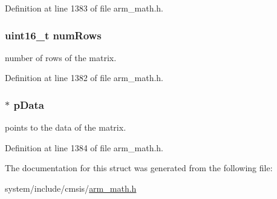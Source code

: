 Definition at line 1383 of file arm\+\_\+math.\+h.

\subsubsection[{\texorpdfstring{num\+Rows}{numRows}}]{\setlength{\rightskip}{0pt plus 5cm}uint16\+\_\+t num\+Rows}\hypertarget{structarm__matrix__instance__f64_a1bcf80ccdc2acc29198f1592ae300390}{}\label{structarm__matrix__instance__f64_a1bcf80ccdc2acc29198f1592ae300390}
number of rows of the matrix. 

Definition at line 1382 of file arm\+\_\+math.\+h.

\subsubsection[{\texorpdfstring{p\+Data}{pData}}]{$\ast$ p\+Data}\hypertarget{structarm__matrix__instance__f64_aa7a4c9839c31e933360ef3a3167b9877}{}\label{structarm__matrix__instance__f64_aa7a4c9839c31e933360ef3a3167b9877}
points to the data of the matrix. 

Definition at line 1384 of file arm\+\_\+math.\+h.



The documentation for this struct was generated from the following file\+:\begin{DoxyCompactItemize}
\item 
system/include/cmsis/\hyperlink{arm__math_8h}{arm\+\_\+math.\+h}\end{DoxyCompactItemize}
